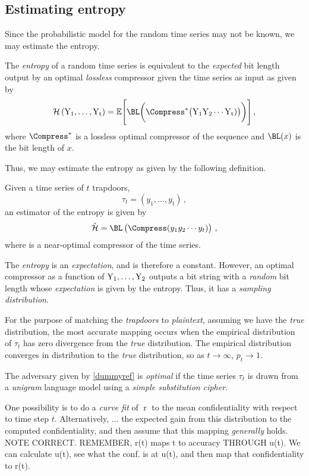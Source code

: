 \documentclass[ ../main.tex]{subfiles}
\begin{document}
\subsection{Estimating entropy}
Since the probabilistic model for the random time series may not be known, we may estimate the entropy.
\begin{postulate}
\label{post:optcomp}
The \emph{entropy} of a random time series is equivalent to the \emph{expected} bit length output by an optimal \emph{lossless} compressor given the time series as input as given by
\begin{equation}
    \entropy\left(\rv{Y_1},\ldots,\rv{Y_t}\right) =
    \expectation\Biggl[
        \BL\biggl(
            \Compress^*\bigl(
                \rv{Y_1} \rv{Y_2} \cdots \rv{Y_t}
                )
            \bigr)
        \biggr)
    \Biggr]\,,
\end{equation}
where $\Compress^*$ is a lossless optimal compressor of the sequence and $\BL(x)$ is the bit length of $x$.
\end{postulate}

Thus, we may estimate the entropy as given by the following definition.
\begin{definition}
Given a time series of $t$ trapdoors,
\begin{equation}
    \tau_t = \left(y_1,\ldots,y_t\right)\,,
\end{equation}
an estimator of the entropy is given by
\begin{equation}
    \hat{\entropy} = \BL\left(\Compress(y_1 y_2 \cdots y_t)\right)\,,
\end{equation}
where \Compress is a near-optimal compressor of the time series.
\end{definition}

The \emph{entropy} is an \emph{expectation}, and is therefore a constant. However, an optimal compressor as a function of $\mathrm{Y_1},\ldots,\mathrm{Y_2}$ outputs a bit string with a \emph{random} bit length whose \emph{expectation} is given by the entropy. Thus, it has a \emph{sampling distribution}.

For the purpose of matching the \emph{trapdoors} to \emph{plaintext}, assuming we have the \emph{true} distribution, the most accurate mapping occurs when the empirical distribution of $\tau_t$ has zero divergence from the \emph{true} distribution. The empirical distribution converges in distribution to the \emph{true} distribution, so as $t \to \infty$, $p_t \to 1$.

The adversary given by \cref{dummyref} is \emph{optimal} if the time series $\tau_t$ is drawn from a \emph{unigram} language model using a \emph{simple substitution cipher}.

One possibility is to do a \emph{curve fit} of $\operatorname{r}$ to the mean confidentiality with respect to time step $t$. Alternatively, ... the expected gain from this distribution to the computed confidentiality, and then assume that this mapping \emph{generally} holds. NOTE CORRECT. REMEMBER, r(t) maps t to accuracy THROUGH u(t). We can calculate u(t), see what the conf. is at u(t), and then map that confidentiality to r(t).
\end{document}
